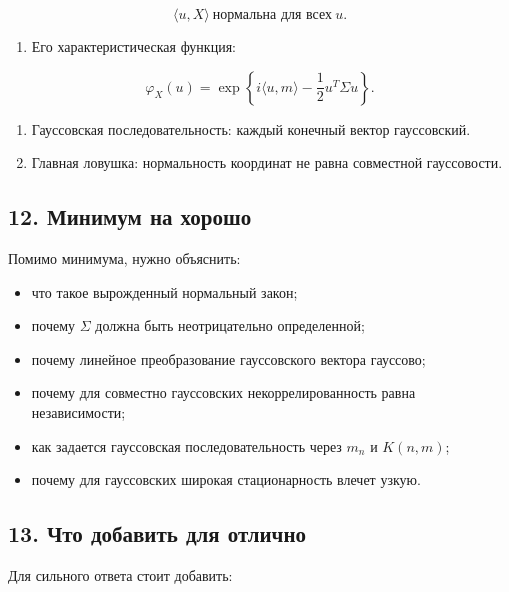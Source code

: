 \documentclass[
  11pt,
  a4paper,
]{article}
\providecommand{\tightlist}{%
  \setlength{\itemsep}{0pt}\setlength{\parskip}{0pt}}
\begin{document}
\[
\langle u,X\rangle\ \text{нормальна для всех}\ u.
\]

\begin{enumerate}
\def\labelenumi{\arabic{enumi}.}
\setcounter{enumi}{2}
\tightlist
\item
  Его характеристическая функция:
\end{enumerate}

\[
\varphi_X(u)=
\exp\left\{i\langle u,m\rangle-\frac12u^T\Sigma u\right\}.
\]

\begin{enumerate}
\def\labelenumi{\arabic{enumi}.}
\setcounter{enumi}{3}
\item
  Гауссовская последовательность: каждый конечный вектор гауссовский.
\item
  Главная ловушка: нормальность координат не равна совместной
  гауссовости.
\end{enumerate}

\subsection{12. Минимум на
хорошо}\label{ux43cux438ux43dux438ux43cux443ux43c-ux43dux430-ux445ux43eux440ux43eux448ux43e}

Помимо минимума, нужно объяснить:

\begin{itemize}
\tightlist
\item
  что такое вырожденный нормальный закон;
\item
  почему \(\Sigma\) должна быть неотрицательно определенной;
\item
  почему линейное преобразование гауссовского вектора гауссово;
\item
  почему для совместно гауссовских некоррелированность равна
  независимости;
\item
  как задается гауссовская последовательность через \(m_n\) и
  \(K(n,m)\);
\item
  почему для гауссовских широкая стационарность влечет узкую.
\end{itemize}

\subsection{13. Что добавить для
отлично}\label{ux447ux442ux43e-ux434ux43eux431ux430ux432ux438ux442ux44c-ux434ux43bux44f-ux43eux442ux43bux438ux447ux43dux43e}

Для сильного ответа стоит добавить:
\end{document}
